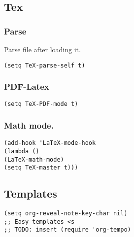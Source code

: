 \documentclass[11pt]{article}
\begin{document}
\subsection*{Tex}
\label{sec:org29c5712}
\subsubsection*{Parse}
\label{sec:org64042d3}
Parse file after loading it.
\begin{verbatim}
(setq TeX-parse-self t)
\end{verbatim}
\subsubsection*{PDF-Latex}
\label{sec:org7452502}
\begin{verbatim}
(setq TeX-PDF-mode t)
\end{verbatim}
\subsubsection*{Math mode.}
\label{sec:org3fdedce}
\begin{verbatim}
(add-hook 'LaTeX-mode-hook
(lambda ()
(LaTeX-math-mode)
(setq TeX-master t)))
\end{verbatim}
\subsection*{Templates}
\label{sec:org30d4277}
\begin{verbatim}
(setq org-reveal-note-key-char nil)
;; Easy templates <s
;; TODO: insert (require 'org-tempo)
\end{verbatim}
\end{document}
